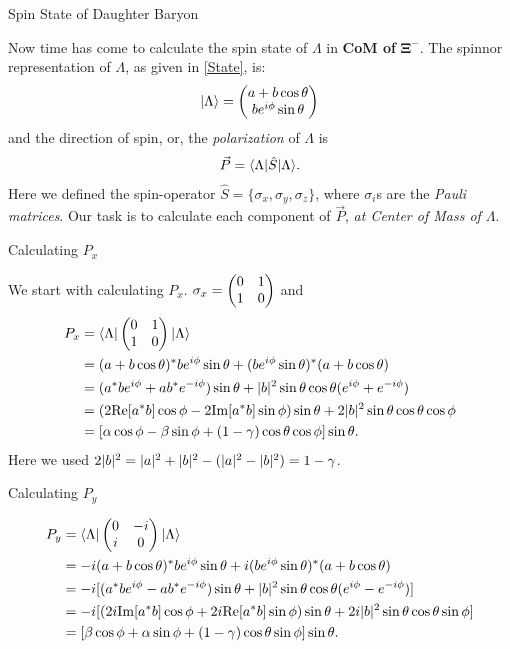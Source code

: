 \documentclass[
	xcolor=dvipsnames,
	10pt, 
	]{beamer}
\begin{document}
\begin{frame}{Spin State of Daughter Baryon}
	\begin{block}{}
		Now time has come to calculate the spin state of $\Lambda$ in \textbf{CoM of }$\mathbf{\Xi^-}$. The spinnor representation of $\Lambda$, as given in \eqref{State}, is:
		\begin{align}
			|\Lambda\rangle = \begin{pmatrix}
		 a + b\cos\theta\\
		  be^{i\phi}\sin\theta 
			\end{pmatrix}\label{Spinnor}
		\end{align}
		and the direction of spin, or, the \textit{polarization} of $\Lambda$ is
		\begin{align}
			\vec P=\langle \Lambda| \hat S|\Lambda\rangle.
		\end{align}
		Here we defined the spin-operator $\hat S = \{\sigma_x,\sigma_y,\sigma_z\}$, where $\sigma_i$s are the \textit{Pauli matrices}.
		Our task is to calculate each component of $\vec P$, \textit{at Center of Mass of $\Lambda$}.
	\end{block}
\end{frame}
\begin{frame}{Calculating $P_x$}
	\begin{block}{}
		We start with calculating $P_x$. $\sigma_x = \begin{pmatrix} 0&1\\ 1&0 \end{pmatrix}$ and
		\begin{align}
			P_x& =\langle \Lambda| \begin{pmatrix} 0&1\\ 1&0 \end{pmatrix} |\Lambda\rangle\nonumber\\
			& = (a +b \cos\theta)^*be^{i\phi}\sin\theta+(be^{i\phi}\sin\theta)^*(a +b \cos\theta)\nonumber\\
			&= (a^*be^{i\phi}+ab^*e^{-i\phi})\sin\theta + |b|^2\sin\theta\cos\theta(e^{i\phi}+e^{-i\phi})\nonumber\\
			&=(2\mathrm{Re}[a^*b]\cos\phi-2 \mathrm{Im}[a^*b]\sin\phi )\sin\theta+2|b|^2\sin\theta\cos\theta\cos\phi\nonumber\\
			&= [\alpha\cos\phi-\beta\sin\phi+ (1-\gamma)\cos\theta\cos\phi]\sin\theta.
		\end{align}
		Here we used $2|b|^2 = |a|^2+|b|^2 - (|a|^2-|b|^2)=1-\gamma$.
	\end{block}
\end{frame}
\begin{frame}{Calculating $P_y$}
	\begin{block}{}
		\begin{align}
	P_y& =\langle \Lambda| \begin{pmatrix} 0&-i\\ i&0 \end{pmatrix} |\Lambda\rangle\nonumber\\
	& =-i (a +b \cos\theta)^*be^{i\phi}\sin\theta+i(be^{i\phi}\sin\theta)^*(a +b \cos\theta)\nonumber\\
	&= -i[(a^*be^{i\phi}-ab^*e^{-i\phi})\sin\theta + |b|^2\sin\theta\cos\theta(e^{i\phi}-e^{-i\phi})]\nonumber\\
	&=-i[(2i\mathrm{Im}[a^*b]\cos\phi+2 i\mathrm{Re}[a^*b]\sin\phi )\sin\theta+2i|b|^2\sin\theta\cos\theta\sin\phi]\nonumber\\
	&= [\beta\cos\phi+\alpha\sin\phi+ (1-\gamma)\cos\theta\sin\phi]\sin\theta.
\end{align}
	\end{block}
\end{frame}
\end{document}
